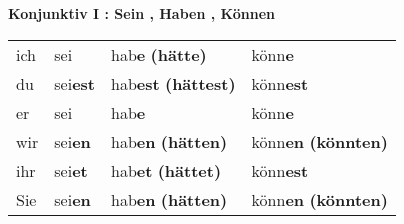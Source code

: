 \documentclass[a4paper,twocolumn,10pt]{article}
\begin{document}


\textbf{Konjunktiv I : Sein , Haben , Können}
\begin{table}[htpb]
	\centering
	\begin{tabular}{llll}

ich  & sei
     & hab\textcolor{cell-lightgreen}{\textbf{e}} \textcolor{cell-lightred}{\textbf{(hätte)}}
     & könn\textcolor{cell-lightgreen}{\textbf{e}}
	 \\


du & sei\textcolor{cell-lightgreen}{\textbf{est}}
   & hab\textcolor{cell-lightgreen}{\textbf{est}} \textcolor{cell-lightred}{\textbf{(hättest)}}
& könn\textcolor{cell-lightgreen}{\textbf{est}}
\\


er & sei
   & hab\textcolor{cell-lightgreen}{\textbf{e}}
   & könn\textcolor{cell-lightgreen}{\textbf{e}}
\\

wir & sei\textcolor{cell-lightgreen}{\textbf{en}}
    & hab\textcolor{cell-lightgreen}{\textbf{en}} \textcolor{cell-lightred}{\textbf{(hätten)}}
    & könn\textcolor{cell-lightgreen}{\textbf{en}} \textcolor{cell-lightred}{\textbf{(könnten)}}
\\

ihr & sei\textcolor{cell-lightgreen}{\textbf{et}}
    & hab\textcolor{cell-lightgreen}{\textbf{et}} \textcolor{cell-lightred}{\textbf{(hättet)}}
    & könn\textcolor{cell-lightgreen}{\textbf{est}}
\\

Sie & sei\textcolor{cell-lightgreen}{\textbf{en}}
    & hab\textcolor{cell-lightgreen}{\textbf{en}} \textcolor{cell-lightred}{\textbf{(hätten)}}
    & könn\textcolor{cell-lightgreen}{\textbf{en}} \textcolor{cell-lightred}{\textbf{(könnten)}}
\\

	\end{tabular}
\end{table}

\end{document}
